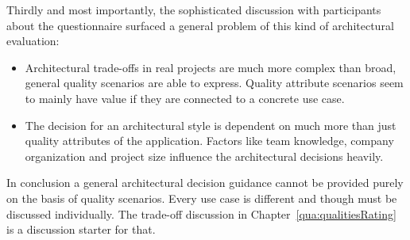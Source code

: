 Thirdly and most importantly, the sophisticated discussion with participants about the questionnaire surfaced a general problem of this kind of architectural evaluation:
\begin{itemize}
\item Architectural trade-offs in real projects are much more complex than broad, general quality scenarios are able to express. Quality attribute scenarios seem to mainly have value if they are connected to a concrete use case.
\item The decision for an architectural style is dependent on much more than just quality attributes of the application. Factors like team knowledge, company organization and project size influence the architectural decisions heavily.
\end{itemize}

In conclusion a general architectural decision guidance cannot be provided purely on the basis of quality scenarios.
Every use case is different and though must be discussed individually.
The trade-off discussion in Chapter~\ref{qua:qualitiesRating} is a discussion starter for that.